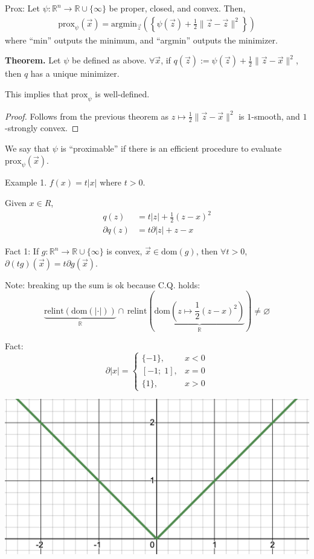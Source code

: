\documentclass{article}
\newcommand{\R}{\mathbb{R}}             %
\newcommand{\x}{\vec{x}}                %
\newcommand{\z}{\vec{z}}                %
\newcommand{\dom}{\text{dom}}           %
\newcommand{\relint}{\text{relint}}     %
\begin{document}
Prox: Let $\psi \colon \R^n \to \R \cup \{\infty\}$ be proper, closed, and convex. Then,
\begin{align*}
    \text{prox}_{\psi}(\x) = \text{argmin}_{\z}\left(\left\{\psi(\z) + \frac{1}{2}\|\z - \z\|^2\right\}\right)
\end{align*}
where ``min'' outputs the minimum, and ``argmin'' outputs the minimizer.

\textbf{Theorem.} Let $\psi$ be defined as above. $\forall \x$, if $q(\z) := \psi(\z) + \frac{1}{2}\|\z - \x\|^2$, then $q$ has a unique minimizer.

This implies that $\text{prox}_\psi$ is well-defined.

\begin{proof}
    Follows from the previous theorem as $z \mapsto \frac{1}{2}\|\z - \x\|^2$ is $1$-smooth, and $1$-strongly convex.
\end{proof}

We say that $\psi$ is ``proximable'' if there is an efficient procedure to evaluate $\text{prox}_\psi(\x)$.

Example 1. $f(x) = t|x|$ where $t > 0$.

Given $x \in R$,
\begin{align*}
    q(z) &= t|z| + \frac{1}{2}(z - x)^2 \\
    \partial q(z) &= t\partial |z| + z - x
\end{align*}

Fact 1: If $g \colon \R^n \to \R \cup \{\infty\}$ is convex, $\x \in \dom(g)$, then $\forall t > 0$, $\partial (tg)(\x) = t \partial g(\x)$.

Note: breaking up the sum is ok because C.Q. holds:
\[
    \underbrace{\relint(\dom(|\cdot|))}_{\R} \cap\, \relint\left(\underbrace{\dom\left(z \mapsto \frac{1}{2}(z - x)^2\right)}_{\R}\right) \neq \varnothing
\]

Fact:
\[
    \partial |x| = \begin{cases}
        \{-1\}, & x < 0 \\
        [-1;\; 1], & x = 0 \\
        \{1\}, & x > 0
    \end{cases}
\]

\begin{center}
    \includegraphics[scale=0.4]{abs_x.png}
\end{center}
\end{document}
